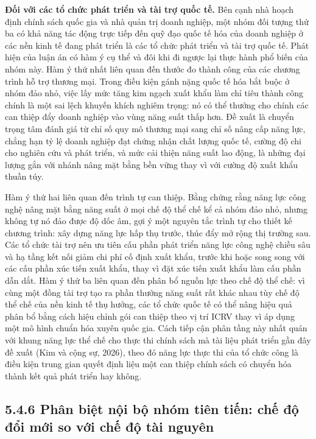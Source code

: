 \documentclass[
  a4paper,
  13pt]{extreport}
\begin{document}
\textbf{Đối với các tổ chức phát triển và tài trợ quốc tế.} Bên cạnh nhà
hoạch định chính sách quốc gia và nhà quản trị doanh nghiệp, một nhóm
đối tượng thứ ba có khả năng tác động trực tiếp đến quỹ đạo quốc tế hóa
của doanh nghiệp ở các nền kinh tế đang phát triển là các tổ chức phát
triển và tài trợ quốc tế. Phát hiện của luận án có hàm ý cụ thể và đôi
khi đi ngược lại thực hành phổ biến của nhóm này. Hàm ý thứ nhất liên
quan đến thước đo thành công của các chương trình hỗ trợ thương mại.
Trong điều kiện gánh nặng quốc tế hóa bắt buộc ở nhóm đảo nhỏ, việc lấy
mức tăng kim ngạch xuất khẩu làm chỉ tiêu thành công chính là một sai
lệch khuyến khích nghiêm trọng: nó có thể thưởng cho chính các can thiệp
đẩy doanh nghiệp vào vùng năng suất thấp hơn. Đề xuất là chuyển trọng
tâm đánh giá từ chỉ số quy mô thương mại sang chỉ số nâng cấp năng lực,
chẳng hạn tỷ lệ doanh nghiệp đạt chứng nhận chất lượng quốc tế, cường độ
chi cho nghiên cứu và phát triển, và mức cải thiện năng suất lao động,
là những đại lượng gắn với nhánh nâng mặt bằng bền vững thay vì với
cường độ xuất khẩu thuần túy.

Hàm ý thứ hai liên quan đến trình tự can thiệp. Bằng chứng rằng năng lực
công nghệ nâng mặt bằng năng suất ở mọi chế độ thể chế kể cả nhóm đảo
nhỏ, nhưng không tự nó đảo được độ dốc âm, gợi ý một nguyên tắc trình tự
cho thiết kế chương trình: xây dựng năng lực hấp thụ trước, thúc đẩy mở
rộng thị trường sau. Các tổ chức tài trợ nên ưu tiên cấu phần phát triển
năng lực công nghệ chiều sâu và hạ tầng kết nối giảm chi phí cố định
xuất khẩu, trước khi hoặc song song với các cấu phần xúc tiến xuất khẩu,
thay vì đặt xúc tiến xuất khẩu làm cấu phần dẫn dắt. Hàm ý thứ ba liên
quan đến phân bổ nguồn lực theo chế độ thể chế: vì cùng một đồng tài trợ
tạo ra phần thưởng năng suất rất khác nhau tùy chế độ thể chế của nền
kinh tế thụ hưởng, các tổ chức quốc tế có thể nâng hiệu quả phân bổ bằng
cách hiệu chỉnh gói can thiệp theo vị trí ICRV thay vì áp dụng một mô
hình chuẩn hóa xuyên quốc gia. Cách tiếp cận phân tầng này nhất quán với
khung năng lực thể chế cho thực thi chính sách mà tài liệu phát triển
gần đây đề xuất (Kim và cộng sự, 2026), theo đó năng lực thực thi của tổ
chức công là điều kiện trung gian quyết định liệu một can thiệp chính
sách có chuyển hóa thành kết quả phát triển hay không.

\hypertarget{phuxe2n-biux1ec7t-nux1ed9i-bux1ed9-nhuxf3m-tiuxean-tiux1ebfn-chux1ebf-ux111ux1ed9-ux111ux1ed5i-mux1edbi-so-vux1edbi-chux1ebf-ux111ux1ed9-tuxe0i-nguyuxean}{%
\subsection{5.4.6 Phân biệt nội bộ nhóm tiên tiến: chế độ đổi mới so với
chế độ tài
nguyên}\label{phuxe2n-biux1ec7t-nux1ed9i-bux1ed9-nhuxf3m-tiuxean-tiux1ebfn-chux1ebf-ux111ux1ed9-ux111ux1ed5i-mux1edbi-so-vux1edbi-chux1ebf-ux111ux1ed9-tuxe0i-nguyuxean}}
\end{document}
